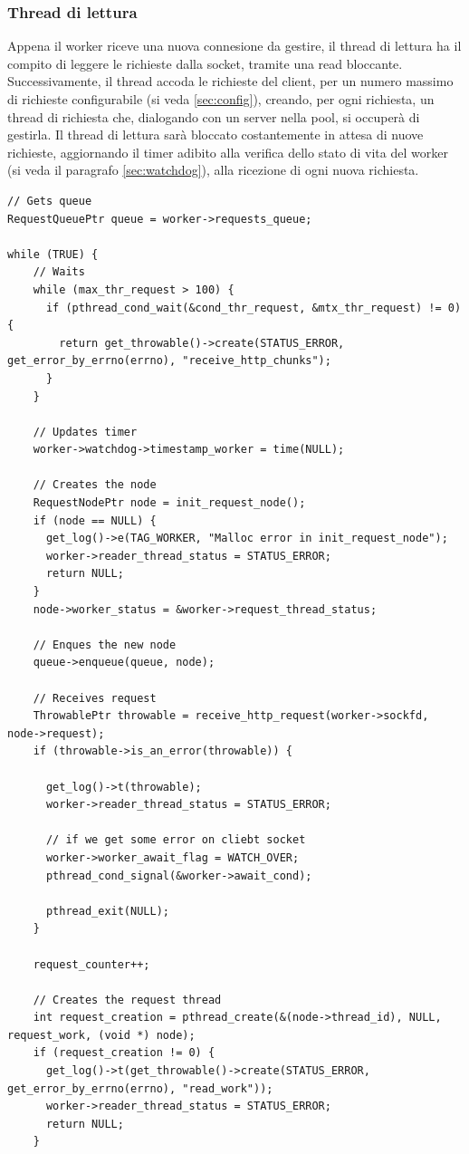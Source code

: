 \documentclass[italian]{tktltiki2}
\begin{document}
\subsubsection{Thread di lettura}
\label{sec:reader}
Appena il worker riceve una nuova connesione da gestire, il thread di lettura ha il compito di leggere le richieste dalla socket, tramite una read bloccante. Successivamente, il thread accoda le richieste del client, per un numero massimo di richieste configurabile (si veda \ref{sec:config}), creando, per ogni richiesta, un thread di richiesta che, dialogando con un server nella pool, si occuperà di gestirla. Il thread di lettura sarà bloccato costantemente in attesa di nuove richieste, aggiornando il timer adibito alla verifica dello stato di vita del worker (si veda il paragrafo \ref{sec:watchdog}), alla ricezione di ogni nuova richiesta. 
\begin{lstlisting}
// Gets queue
RequestQueuePtr queue = worker->requests_queue;

while (TRUE) {
    // Waits
    while (max_thr_request > 100) {
      if (pthread_cond_wait(&cond_thr_request, &mtx_thr_request) != 0) {
        return get_throwable()->create(STATUS_ERROR, get_error_by_errno(errno), "receive_http_chunks");
      }
    }

    // Updates timer
    worker->watchdog->timestamp_worker = time(NULL);

    // Creates the node
    RequestNodePtr node = init_request_node();
    if (node == NULL) {
      get_log()->e(TAG_WORKER, "Malloc error in init_request_node");
      worker->reader_thread_status = STATUS_ERROR;
      return NULL;
    }
    node->worker_status = &worker->request_thread_status;

    // Enques the new node
    queue->enqueue(queue, node);

    // Receives request
    ThrowablePtr throwable = receive_http_request(worker->sockfd, node->request);
    if (throwable->is_an_error(throwable)) {

      get_log()->t(throwable);
      worker->reader_thread_status = STATUS_ERROR;

      // if we get some error on cliebt socket
      worker->worker_await_flag = WATCH_OVER;
      pthread_cond_signal(&worker->await_cond);

      pthread_exit(NULL);
    }

    request_counter++;

    // Creates the request thread
    int request_creation = pthread_create(&(node->thread_id), NULL, request_work, (void *) node);
    if (request_creation != 0) {
      get_log()->t(get_throwable()->create(STATUS_ERROR, get_error_by_errno(errno), "read_work"));
      worker->reader_thread_status = STATUS_ERROR;
      return NULL;
    }


\end{lstlisting}
\end{document}
